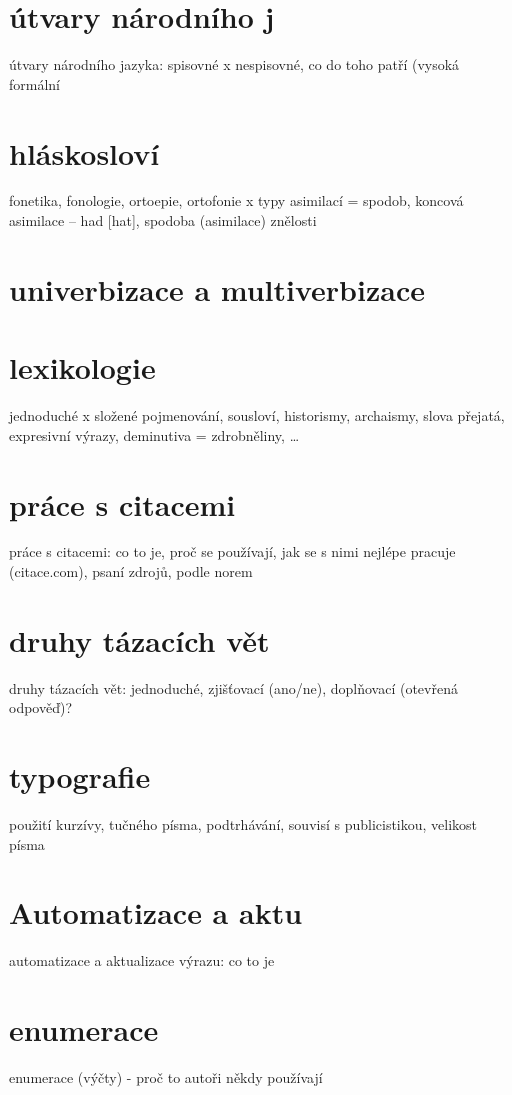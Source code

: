 \documentclass{memoir}
\begin{document}
\section*{útvary národního j}
útvary národního jazyka: spisovné x nespisovné, co do toho patří (vysoká formální

\section*{hláskosloví}
fonetika, fonologie, ortoepie, ortofonie x typy asimilací = spodob, koncová asimilace – had [hat], spodoba (asimilace) znělosti

\section*{univerbizace a multiverbizace}

\section*{lexikologie}
jednoduché x složené pojmenování, sousloví, historismy, archaismy, slova přejatá, expresivní výrazy, deminutiva = zdrobněliny, …

\section*{práce s citacemi}
práce s citacemi: co to je, proč se používají, jak se s nimi nejlépe pracuje (citace.com), psaní zdrojů, podle norem

\section*{druhy tázacích vět}
druhy tázacích vět: jednoduché, zjišťovací (ano/ne), doplňovací (otevřená odpověď)?

\section*{typografie}
použití kurzívy, tučného písma, podtrhávání, souvisí s publicistikou, velikost písma

\section*{Automatizace a aktu}
automatizace a aktualizace výrazu: co to je

\section*{enumerace}
enumerace (výčty) - proč to autoři někdy používají
\end{document}

